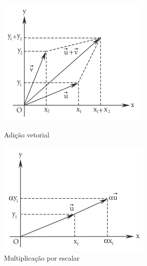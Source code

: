 \begin{figure}[H]
  \centering
  \begin{minipage}{0.45\textwidth}
    \centering
    \includegraphics[width=\linewidth]{./fig/fig1.43a.png}
    \caption{Adição vetorial}\label{fig:fig1.43a}
  \end{minipage}
  \hfill
  \begin{minipage}{0.45\textwidth}
    \centering
    \includegraphics[width=\linewidth]{./fig/fig1.43b.png}
    \caption{Multiplicação por escalar}\label{fig:fig1.43b}
  \end{minipage}
\end{figure}


